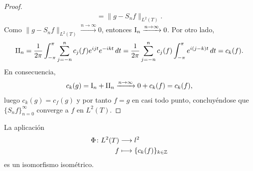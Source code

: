 \documentclass[a4paper, 11pt, oneside]{report}
\begin{document}
\begin{proof}
\begin{align*}
     = \|g-S_nf\|_{L^2(T)}.
  \end{align*}
  Como $\|g-S_nf\|_{L^2(T)} \xrightarrow{n \to \infty} 0$, entonces $\textup{I}_n\xrightarrow{n \to \infty} 0$. Por otro lado,
  \begin{align*}
    \textup{II}_n = \frac{1}{2\pi}\int_{-\pi}^\pi \sum_{j=-n}^n c_j(f)e^{ijt}e^{-ikt} \, dt = \frac{1}{2\pi}\sum_{j=-n}^n c_j(f)\int_{-\pi}^\pi e^{i(j-k)t}\, dt = c_k(f).
  \end{align*}
  En consecuencia,
  \[c_k(g) = \textup{I}_n + \textup{II}_n \xrightarrow{n \to \infty} 0 + c_k(f)=c_k(f),\]
  luego $c_k(g)=c_f(g)$ y por tanto $f = g$ en casi todo punto, concluyéndose que $\{S_nf\}_{n=0}^\infty$ converge a $f$ en $L^2(T)$.
\end{proof}

\begin{theorem}
  La aplicación
  \begin{align*}
    \Phi \colon L^2(T) &\longrightarrow l^2 \\
    f &\longmapsto \{c_k(f)\}_{k \in \mathbb Z}
  \end{align*}
  es un isomorfismo isométrico.
\end{theorem}
\end{document}
